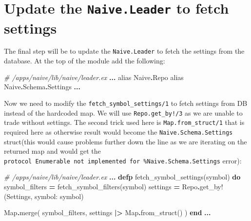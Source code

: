 \documentclass[
]{book}
\newenvironment{Shaded}{\begin{snugshade}}{\end{snugshade}}
\newcommand{\CommentTok}[1]{\textcolor[rgb]{0.56,0.35,0.01}{\textit{#1}}}
\newcommand{\ConstantTok}[1]{\textcolor[rgb]{0.00,0.00,0.00}{#1}}
\newcommand{\ImportTok}[1]{#1}
\newcommand{\KeywordTok}[1]{\textcolor[rgb]{0.13,0.29,0.53}{\textbf{#1}}}
\newcommand{\NormalTok}[1]{#1}
\newcommand{\OperatorTok}[1]{\textcolor[rgb]{0.81,0.36,0.00}{\textbf{#1}}}
\newcommand{\VariableTok}[1]{\textcolor[rgb]{0.00,0.00,0.00}{#1}}
\begin{document}
\hypertarget{update-the-naive.leader-to-fetch-settings}{%
\section{\texorpdfstring{Update the \texttt{Naive.Leader} to fetch settings}{Update the Naive.Leader to fetch settings}}\label{update-the-naive.leader-to-fetch-settings}}

The final step will be to update the \texttt{Naive.Leader} to fetch the settings from the database. At the top of the module add the following:

\begin{Shaded}
\begin{Highlighting}[]
\CommentTok{\# /apps/naive/lib/naive/leader.ex}
  \OperatorTok{...}
  \ImportTok{alias} \ConstantTok{Naive}\OperatorTok{.}\ConstantTok{Repo}
  \ImportTok{alias} \ConstantTok{Naive}\OperatorTok{.}\ConstantTok{Schema}\OperatorTok{.}\ConstantTok{Settings}
  \OperatorTok{...}
\end{Highlighting}
\end{Shaded}

Now we need to modify the \texttt{fetch\_symbol\_settings/1} to fetch settings from DB instead of the hardcoded map. We will use \texttt{Repo.get\_by!/3} as we are unable to trade without settings. The second trick used here is \texttt{Map.from\_struct/1} that is required here as otherwise result would become the \texttt{Naive.Schema.Settings} struct(this would cause problems further down the line as we are iterating on the returned map and would get the \texttt{protocol\ Enumerable\ not\ implemented\ for\ \%Naive.Schema.Settings} error):

\begin{Shaded}
\begin{Highlighting}[]
\CommentTok{\# /apps/naive/lib/naive/leader.ex}
  \OperatorTok{...}
  \KeywordTok{defp}\NormalTok{ fetch\_symbol\_settings(symbol) }\KeywordTok{do}
\NormalTok{    symbol\_filters }\OperatorTok{=}\NormalTok{ fetch\_symbol\_filters(symbol)}
\NormalTok{    settings }\OperatorTok{=} \ConstantTok{Repo}\OperatorTok{.}\NormalTok{get\_by!(}\ConstantTok{Settings}\NormalTok{, }\VariableTok{symbol:}\NormalTok{ symbol)}

    \ConstantTok{Map}\OperatorTok{.}\NormalTok{merge(}
\NormalTok{      symbol\_filters,}
\NormalTok{      settings }\OperatorTok{|\textgreater{}} \ConstantTok{Map}\OperatorTok{.}\NormalTok{from\_struct()}
\NormalTok{    )}
  \KeywordTok{end}
  \OperatorTok{...}
\end{Highlighting}
\end{Shaded}
\end{document}
